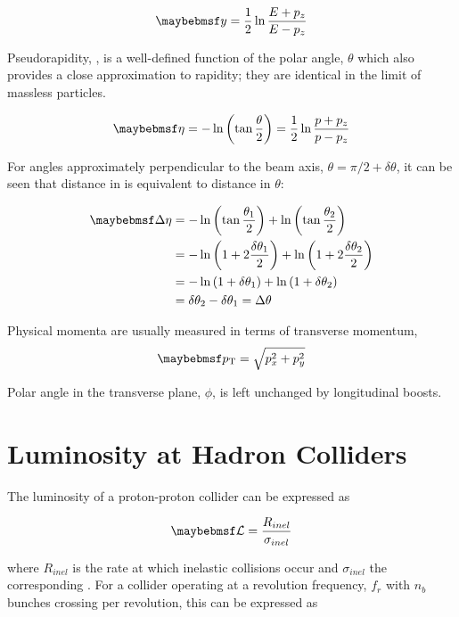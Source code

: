 \begin{equation}
  \rap = \frac{1}{2}\ln{\frac{E+p_z}{E-p_z}}
\end{equation}

Pseudorapidity, \pseudorap, is a well-defined function of the polar angle, $\theta$ which also provides a close approximation to rapidity; they are identical in the limit of massless particles.

\begin{equation}
  \pseudorap = -\ln \left( \tan{\frac{\theta}{2}} \right) = \frac{1}{2}\ln{\frac{p+p_z}{p-p_z}}
\end{equation}

For angles approximately perpendicular to the beam axis, $\theta = \pi/2 + \delta\theta$, it can be seen that distance in \pseudorap is equivalent to distance in $\theta$:

\begin{equation}
\begin{split}
  \DeltaEta &= -\ln \left( \tan{\frac{\theta_1}{2}} \right) + \ln \left( \tan{\frac{\theta_2}{2}} \right) \\
            &= -\ln \left( 1 + 2\frac{\delta\theta_1}{2} \right) + \ln \left( 1 + 2\frac{\delta\theta_2}{2} \right) \\
            &= -\ln \left( 1 + \delta\theta_1 \right) + \ln \left( 1 + \delta\theta_2 \right) \\
            &= \delta\theta_2 - \delta\theta_1 = \Delta\theta
\end{split}
\end{equation}

Physical momenta are usually measured in terms of transverse momentum, \pT
\begin{equation}
  \pT = \sqrt{ p_x^2 + p_y^2 }
\end{equation}

Polar angle in the transverse plane, $\phi$, is left unchanged by longitudinal boosts.

\section{Luminosity at Hadron Colliders}
\label{sec:bg-theory:luminosity}
The luminosity of a proton-proton collider can be expressed as

\begin{equation}
  \luminosity = \frac{R_{inel}}{\sigma_{inel}}
\end{equation}

where $R_{inel}$ is the rate at which inelastic collisions occur and $\sigma_{inel}$ the corresponding \xs.
For a collider operating at a revolution frequency, $f_r$ with $n_b$ bunches crossing per revolution, this can be expressed as

